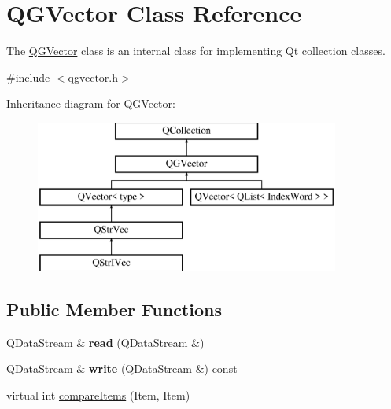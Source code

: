 \hypertarget{class_q_g_vector}{}\section{Q\+G\+Vector Class Reference}
\label{class_q_g_vector}


The \mbox{\hyperlink{class_q_g_vector}{Q\+G\+Vector}} class is an internal class for implementing Qt collection classes.  




{\ttfamily \#include $<$qgvector.\+h$>$}

Inheritance diagram for Q\+G\+Vector\+:\begin{figure}[H]
\begin{center}
\leavevmode
\includegraphics[height=5.000000cm]{class_q_g_vector}
\end{center}
\end{figure}
\subsection*{Public Member Functions}
\begin{DoxyCompactItemize}
\item 
\mbox{\label{class_q_g_vector_a9023b4232fc0b7bd6e8e14f5af5090d8}} 
\mbox{\hyperlink{class_q_data_stream}{Q\+Data\+Stream}} \& {\bfseries read} (\mbox{\hyperlink{class_q_data_stream}{Q\+Data\+Stream}} \&)
\item 
\mbox{\label{class_q_g_vector_af81f0f1719b2ef4215cd6014d72c7f44}} 
\mbox{\hyperlink{class_q_data_stream}{Q\+Data\+Stream}} \& {\bfseries write} (\mbox{\hyperlink{class_q_data_stream}{Q\+Data\+Stream}} \&) const
\item 
virtual int \mbox{\hyperlink{class_q_g_vector_a65a79a6de037a4033ead55891622f5e2}{compare\+Items}} (Item, Item)
\end{DoxyCompactItemize}
